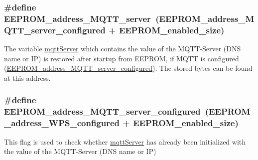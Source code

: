 \hypertarget{WIFIOnOff_8ino_add6dd801239610f299da096ea9b87383}{
\subsubsection[{E\-E\-P\-R\-O\-M\-\_\-address\-\_\-\-M\-Q\-T\-T\-\_\-server}]{\setlength{\rightskip}{0pt plus 5cm}\#define E\-E\-P\-R\-O\-M\-\_\-address\-\_\-\-M\-Q\-T\-T\-\_\-server~({\bf E\-E\-P\-R\-O\-M\-\_\-address\-\_\-\-M\-Q\-T\-T\-\_\-server\-\_\-configured} + {\bf E\-E\-P\-R\-O\-M\-\_\-enabled\-\_\-size})}}\label{WIFIOnOff_8ino_add6dd801239610f299da096ea9b87383}


The variable \hyperlink{WIFIOnOff_8ino_a020889fcca6224d14f4d3f4241ca4467}{mqtt\-Server} which contains the value of the M\-Q\-T\-T-\/\-Server (D\-N\-S name or I\-P) is restored after startup from E\-E\-P\-R\-O\-M, if M\-Q\-T\-T is configured (\hyperlink{WIFIOnOff_8ino_a604b9f83bce537df8060d5bb69480c76}{E\-E\-P\-R\-O\-M\-\_\-address\-\_\-\-M\-Q\-T\-T\-\_\-server\-\_\-configured}). The stored bytes can be found at this address. 

\hypertarget{WIFIOnOff_8ino_a604b9f83bce537df8060d5bb69480c76}{
\subsubsection[{E\-E\-P\-R\-O\-M\-\_\-address\-\_\-\-M\-Q\-T\-T\-\_\-server\-\_\-configured}]{\setlength{\rightskip}{0pt plus 5cm}\#define E\-E\-P\-R\-O\-M\-\_\-address\-\_\-\-M\-Q\-T\-T\-\_\-server\-\_\-configured~({\bf E\-E\-P\-R\-O\-M\-\_\-address\-\_\-\-W\-P\-S\-\_\-configured} + {\bf E\-E\-P\-R\-O\-M\-\_\-enabled\-\_\-size})}}\label{WIFIOnOff_8ino_a604b9f83bce537df8060d5bb69480c76}


This flag is used to check whether \hyperlink{WIFIOnOff_8ino_a020889fcca6224d14f4d3f4241ca4467}{mqtt\-Server} has already been initialized with the value of the M\-Q\-T\-T-\/\-Server (D\-N\-S name or I\-P) 

